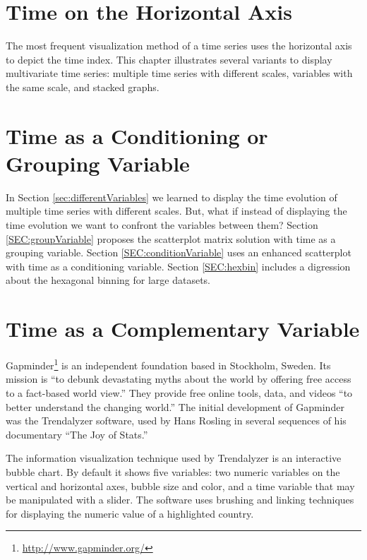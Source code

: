 \chapter{Time on the Horizontal Axis}
\label{cha:timeHorizontalAxis}

The most frequent visualization method of a time series uses the
horizontal axis to depict the time index. This chapter illustrates
several variants to display multivariate time series: multiple
time series with different scales, variables with the same scale, and
stacked graphs.



\chapter{Time as a Conditioning or Grouping Variable}
\label{cha:timeGroupFactor}

In Section \ref{sec:differentVariables} we learned to display the time
evolution of multiple time series with different scales. But, what if
instead of displaying the time evolution we want to confront the
variables between them? Section \ref{SEC:groupVariable} proposes the
scatterplot matrix solution with time as a grouping variable. Section
\ref{SEC:conditionVariable} uses an enhanced scatterplot with time as
a conditioning variable. Section \ref{SEC:hexbin} includes a
digression about the hexagonal binning for large datasets.



\chapter{Time as a Complementary Variable}
\label{cha:timeComplementary}

Gapminder\footnote{\url{http://www.gapminder.org/}} is an independent
foundation based in Stockholm, Sweden. Its mission is ``to debunk
devastating myths about the world by offering free access to a
fact-based world view.'' They provide free online tools, data, and
videos ``to better understand the changing world.'' The initial
development of Gapminder was the Trendalyzer software, used by Hans
Rosling in several sequences of his documentary ``The Joy of Stats.''

The information visualization technique used by Trendalyzer is an
interactive bubble chart. By default it shows five variables: two
numeric variables on the vertical and horizontal axes, bubble size and
color, and a time variable that may be manipulated with a slider. The
software uses brushing and linking techniques for displaying the
numeric value of a highlighted country.

